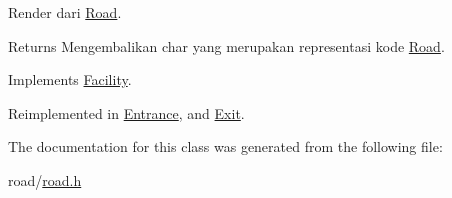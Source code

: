 Render dari \hyperlink{classRoad}{Road}. 

\begin{DoxyReturn}{Returns}
Mengembalikan char yang merupakan representasi kode \hyperlink{classRoad}{Road}. 
\end{DoxyReturn}


Implements \hyperlink{classFacility_a177b3f9cd142fe4521c1d15b00d3675c}{Facility}.



Reimplemented in \hyperlink{classEntrance_a7226e0cd3d04f8370ede2573bc2852f3}{Entrance}, and \hyperlink{classExit_a9239e8b13c101d1aee8fde738e8a5fdc}{Exit}.



The documentation for this class was generated from the following file\+:\begin{DoxyCompactItemize}
\item 
road/\hyperlink{road_8h}{road.\+h}\end{DoxyCompactItemize}
